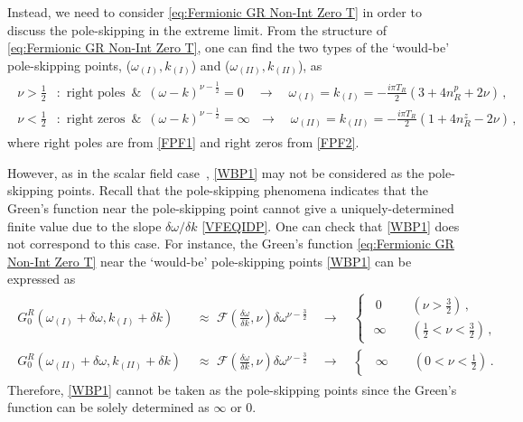 \documentclass[11pt,a4paper]{article}
\begin{document}
Instead, we need to consider \eqref{eq:Fermionic GR Non-Int Zero T} in order to discuss the pole-skipping in the extreme limit. 
From the structure of \eqref{eq:Fermionic GR Non-Int Zero T}, one can find the two types of the `would-be' pole-skipping points, ($\omega_{(I)}, k_{(I)}$) and ($\omega_{(II)}, k_{(II)}$), as
\begin{align}\label{WBP1}
\begin{split}
\nu > \frac{1}{2}&:\,\,  \text{right poles} \,\,\,\&\,\,\, (\omega-k)^{\nu - \frac{1}{2}} = 0 \quad\rightarrow\quad \omega_{(I)} = k_{(I)} = -\frac{i \pi T_R}{2} (3 + 4 n^{p}_{R} + 2\nu)\,,\\
%
\nu < \frac{1}{2}&:\,\,  \text{right zeros} \,\,\,\&\,\,\, (\omega-k)^{\nu - \frac{1}{2}} = \infty \,\,\,\,\rightarrow\quad \omega_{(II)} = k_{(II)} = -\frac{i \pi T_R}{2} (1 + 4 n^{z}_{R}-2\nu)\,,
\end{split} 
\end{align}
where right poles are from \eqref{FPF1} and right zeros from \eqref{FPF2}.

However, as in the scalar field case~\cite{Natsuume:2020snz}, \eqref{WBP1} may not be considered as the pole-skipping points.
Recall that the pole-skipping phenomena indicates that the Green's function near the pole-skipping point cannot give a uniquely-determined finite value due to the slope $\delta \omega/\delta k$ \eqref{VFEQIDP}.
One can check that \eqref{WBP1} does not correspond to this case. For instance, the Green's function \eqref{eq:Fermionic GR Non-Int Zero T} near the `would-be' pole-skipping points \eqref{WBP1} can be expressed as
\begin{align}\label{CHECKINGPSW}
\begin{split}
G^R_0(\omega_{(I)} + \delta \omega, k_{(I)} + \delta k)  &\,\,\approx\,\, \mathcal{F}\left(\frac{\delta \omega}{\delta k}, \nu\right) \delta \omega^{\nu-\frac{3}{2}} \quad\rightarrow\quad
\begin{cases}
       \,\,\, 0 \qquad\,\, \left(  \nu > \frac{3}{2} \right) \,, \\
       \,\, \infty \qquad \left( \frac{1}{2}<\nu<\frac{3}{2} \right) \,,
\end{cases}
%
\\
G^R_0(\omega_{(II)} + \delta \omega, k_{(II)} + \delta k)  &\,\,\approx\,\, \mathcal{F}\left(\frac{\delta \omega}{\delta k}, \nu\right) \delta \omega^{\nu-\frac{3}{2}} \quad\rightarrow\quad
\begin{cases}
        \,\,\, \infty \qquad \left(0 < \nu<\frac{1}{2} \right) \,.
\end{cases}
\end{split} 
\end{align}
Therefore, \eqref{WBP1} cannot be taken as the pole-skipping points since the Green's function can be solely determined as $\infty$ or $0$.
\end{document}
